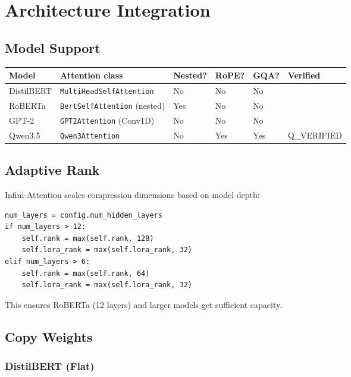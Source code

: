 
\section{Architecture Integration}

\subsection{Model Support}

\begin{table}[H]
\centering
\small
\begin{tabular}{llllll}
\toprule
\textbf{Model} & \textbf{Attention class} & \textbf{Nested?} & \textbf{RoPE?} & \textbf{GQA?} & \textbf{Verified} \\
\midrule
DistilBERT & \texttt{MultiHeadSelfAttention} & No & No & No &  \\
RoBERTa & \texttt{BertSelfAttention} (nested) & Yes & No & No &  \\
GPT-2 & \texttt{GPT2Attention} (Conv1D) & No & No & No &  \\
Qwen3.5 & \texttt{Qwen3Attention} & No & Yes & Yes & {{Q\_VERIFIED}} \\
\bottomrule
\end{tabular}
\end{table}

\subsection{Adaptive Rank}

Infini-Attention scales compression dimensions based on model depth:

\begin{lstlisting}
num_layers = config.num_hidden_layers
if num_layers > 12:
    self.rank = max(self.rank, 128)
    self.lora_rank = max(self.lora_rank, 32)
elif num_layers > 6:
    self.rank = max(self.rank, 64)
    self.lora_rank = max(self.lora_rank, 32)
\end{lstlisting}

This ensures RoBERTa (12 layers) and larger models get sufficient 
capacity.

\subsection{Copy Weights}

\subsubsection{DistilBERT (Flat)}

